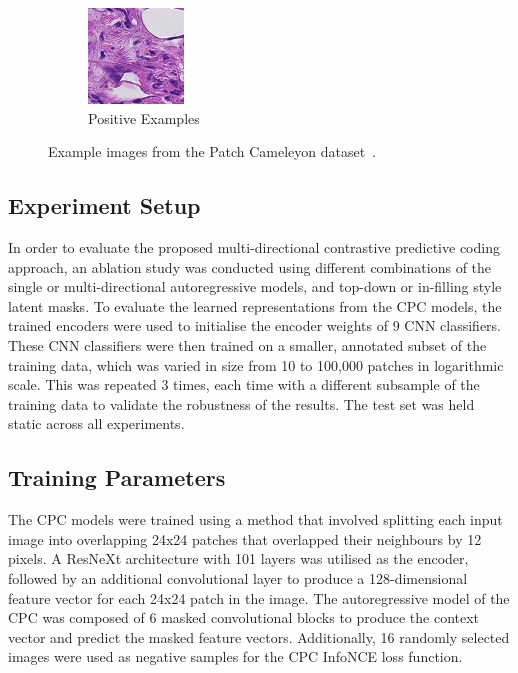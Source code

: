 \begin{figure}
\begin{subfigure}{\textwidth}
	\includegraphics[width=0.3\linewidth]{images/pcam_22_1.png}
	\caption{Positive Examples}
\end{subfigure}
	\caption{Example images from the Patch Cameleyon dataset~\citep{veeling2018rotation,litjens20181399}.}
	\label{fig:pcam_examples}
\end{figure}

\subsection{Experiment Setup}
\label{subsec:unsupervised_experiment}
In order to evaluate the proposed multi-directional contrastive predictive coding approach, an ablation study was conducted using different combinations of the single or multi-directional autoregressive models, and top-down or in-filling style latent masks. To evaluate the learned representations from the CPC models, the trained encoders were used to initialise the encoder weights of 9 CNN classifiers. These CNN classifiers were then trained on a smaller, annotated subset of the training data, which was varied in size from 10 to 100,000 patches in logarithmic scale. This was repeated 3 times, each time with a different subsample of the training data to validate the robustness of the results. The test set was held static across all experiments.

\subsection{Training Parameters}
\label{subsec:unsupervised_training}
The CPC models were trained using a method that involved splitting each input image into overlapping 24x24 patches that overlapped their neighbours by 12 pixels. A ResNeXt architecture with 101 layers was utilised as the encoder, followed by an additional convolutional layer to produce a 128-dimensional feature vector for each 24x24 patch in the image. The autoregressive model of the CPC was composed of 6 masked convolutional blocks to produce the context vector and predict the masked feature vectors. Additionally, 16 randomly selected images were used as negative samples for the CPC InfoNCE loss function.

